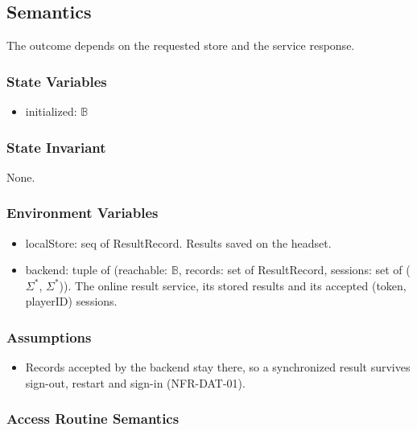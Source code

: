 \documentclass[12pt, titlepage]{article}
\begin{document}
\subsection{Semantics}

The outcome depends on the requested store and the service response.

\subsubsection{State Variables}

\begin{itemize}
\item initialized: $\mathbb{B}$
\end{itemize}

\subsubsection{State Invariant}

None.

\subsubsection{Environment Variables}

\begin{itemize}
\item localStore: seq of ResultRecord. Results saved on the headset.
\item backend: tuple of (reachable: $\mathbb{B}$, records: set of
  ResultRecord, sessions: set of ($\Sigma^*$, $\Sigma^*$)). The online result
  service, its stored results and its accepted (token, playerID) sessions.
\end{itemize}

\subsubsection{Assumptions}

\begin{itemize}
\item Records accepted by the backend stay there, so a synchronized result
  survives sign-out, restart and sign-in (NFR-DAT-01).
\end{itemize}

\subsubsection{Access Routine Semantics}
\end{document}
